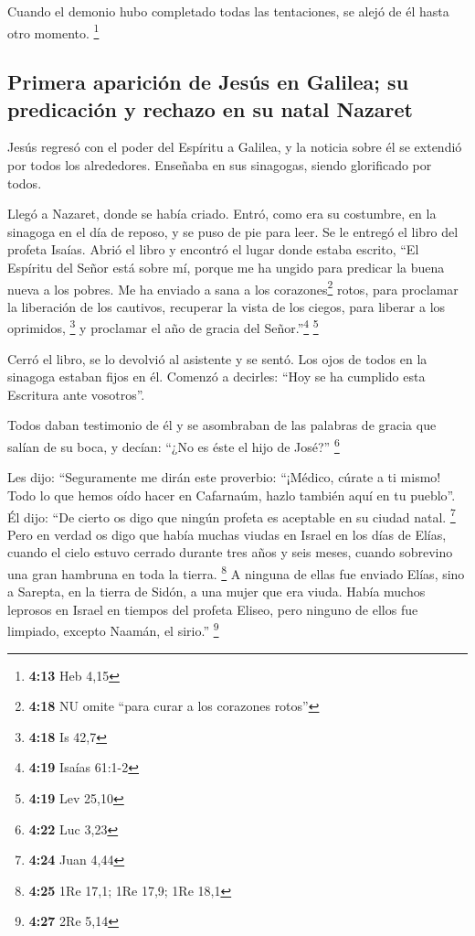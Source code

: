 \begin{paracol}{2}
 Cuando el demonio hubo completado todas las tentaciones,
se alejó de él hasta otro momento. \footnote{\textbf{4:13} Heb 4,15}

\hypertarget{primera-apariciuxf3n-de-jesuxfas-en-galilea-su-predicaciuxf3n-y-rechazo-en-su-natal-nazaret}{%
\subsection{Primera aparición de Jesús en Galilea; su predicación y
rechazo en su natal
Nazaret}\label{primera-apariciuxf3n-de-jesuxfas-en-galilea-su-predicaciuxf3n-y-rechazo-en-su-natal-nazaret}}

 Jesús regresó con el poder del Espíritu a Galilea, y la
noticia sobre él se extendió por todos los alrededores. 
Enseñaba en sus sinagogas, siendo glorificado por todos.

 Llegó a Nazaret, donde se había criado. Entró, como era
su costumbre, en la sinagoga en el día de reposo, y se puso de pie para
leer.  Se le entregó el libro del profeta Isaías. Abrió
el libro y encontró el lugar donde estaba escrito,  ``El
Espíritu del Señor está sobre mí, porque me ha ungido para predicar la
buena nueva a los pobres. Me ha enviado a sana a los
corazones\footnote{\textbf{4:18} NU omite ``para curar a los corazones
  rotos''} rotos, para proclamar la liberación de los cautivos,
recuperar la vista de los ciegos, para liberar a los oprimidos,
\footnote{\textbf{4:18} Is 42,7}  y proclamar el año de
gracia del Señor.''\footnote{\textbf{4:19} Isaías 61:1-2} \footnote{\textbf{4:19}
  Lev 25,10}

 Cerró el libro, se lo devolvió al asistente y se sentó.
Los ojos de todos en la sinagoga estaban fijos en él. 
Comenzó a decirles: ``Hoy se ha cumplido esta Escritura ante vosotros''.

 Todos daban testimonio de él y se asombraban de las
palabras de gracia que salían de su boca, y decían: ``¿No es éste el
hijo de José?'' \footnote{\textbf{4:22} Luc 3,23}

 Les dijo: ``Seguramente me dirán este proverbio:
``¡Médico, cúrate a ti mismo! Todo lo que hemos oído hacer en Cafarnaúm,
hazlo también aquí en tu pueblo''.  Él dijo: ``De cierto
os digo que ningún profeta es aceptable en su ciudad natal. \footnote{\textbf{4:24}
  Juan 4,44}  Pero en verdad os digo que había muchas
viudas en Israel en los días de Elías, cuando el cielo estuvo cerrado
durante tres años y seis meses, cuando sobrevino una gran hambruna en
toda la tierra. \footnote{\textbf{4:25} 1Re 17,1; 1Re 17,9; 1Re 18,1}
 A ninguna de ellas fue enviado Elías, sino a Sarepta, en
la tierra de Sidón, a una mujer que era viuda.  Había
muchos leprosos en Israel en tiempos del profeta Eliseo, pero ninguno de
ellos fue limpiado, excepto Naamán, el sirio.'' \footnote{\textbf{4:27}
  2Re 5,14}


\end{paracol}
